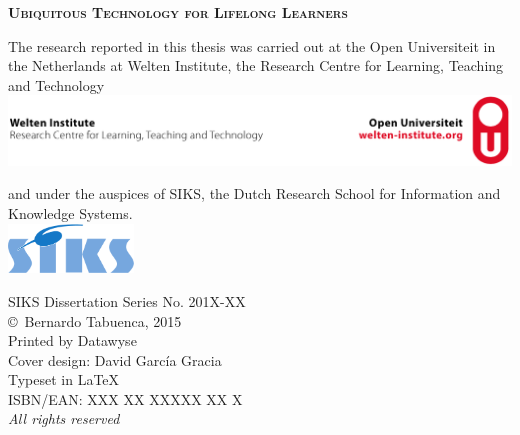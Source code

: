 \documentclass[normalheadings,tablecaptionabove,twoside,openright,chapterprefix,halfparskip,fontsize=10pt,numbers=noenddot]{scrbook} %
\begin{document}

\begin{titlepage}
	\null\vspace*{15.25em}
	\center
	\huge
	\textbf{\textsc{Ubiquitous Technology for Lifelong Learners}}\\
	\vfill\null
	
	\newpage
	\pagestyle{empty}
	\raggedright
	\normalsize
	The research reported in this thesis was carried out at the Open Universiteit in the Netherlands at Welten Institute, the Research Centre for Learning, Teaching and Technology\\
	\vspace*{1em}
	\center
	\includegraphics[width=1\textwidth]{figures/weltenlarge} \\ %
	\vspace*{1em}
	\raggedright
	and under the auspices of SIKS, the Dutch Research School for Information and Knowledge Systems.\\
	\vspace*{1em}
	\center
	\includegraphics[width=0.25\textwidth]{figures/siks-kleur}\\ %
	\vfill
	\raggedright
	SIKS Dissertation Series No. 201X-XX \\
	\vspace*{2em}
	\copyright~Bernardo Tabuenca, 2015\\
	Printed by Datawyse\\
	Cover design: David Garc\'ia Gracia\\
	Typeset in \LaTeX\\
	\vspace*{2em}
	ISBN/EAN: XXX XX XXXXX XX X\\
	\textit{All rights reserved}
	

\end{titlepage}
\end{document}
